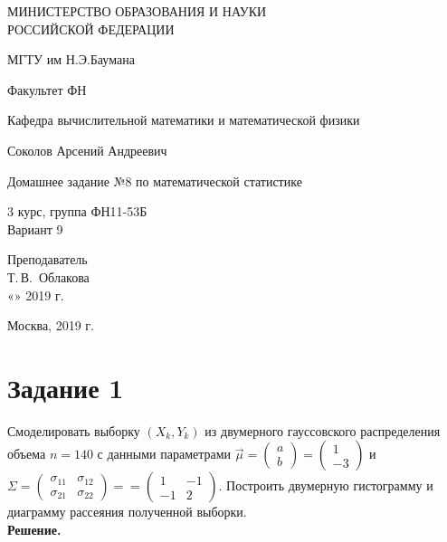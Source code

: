 \documentclass[14pt,a4paper]{scrartcl}
\begin{document}
	\begin{titlepage}
	\begin{center}
		\large
		МИНИСТЕРСТВО ОБРАЗОВАНИЯ И НАУКИ\\ РОССИЙСКОЙ ФЕДЕРАЦИИ
		
		\vspace{0.5cm}
		
		МГТУ им Н.Э.Баумана
		\vspace{0.25cm}
		
		Факультет ФН
		
		Кафедра вычислительной математики и математической физики
		\vfill
		
		
		Соколов Арсений Андреевич\\
		\vfill
		
		
		{\LARGE Домашнее задание №8 по математической статистике\\[2mm]
		}
		\bigskip
		
		3 курс, группа ФН11-53Б\\
		Вариант 9
	\end{center}
	\vfill
	
	\newlength{\ML}
	\hfill\begin{minipage}{0.4\textwidth}
		Преподаватель\\
		\underline{\hspace{3cm}} Т.\,В.~Облакова\\
		«\underline{\hspace{0.7cm}}» \underline{\hspace{1.71cm}} 2019 г.
	\end{minipage}%
	\bigskip
	
	
	\vfill
	
	\begin{center}
		Москва, 2019 г.
	\end{center}
\end{titlepage}

\section*{Задание 1}


Смоделировать выборку $(X_k, Y_k)$ из двумерного гауссовского распределения объема $n=140$ с данными параметрами $\vec{\mu} = \begin{pmatrix} a \\ b \end{pmatrix} = \begin{pmatrix} 1 \\ -3 \end{pmatrix}$ и $\Sigma = {\begin{pmatrix}
\sigma_{11} & \sigma_{12}\\
\sigma_{21} & \sigma_{22}
\end{pmatrix} =} =\begin{pmatrix}
1 & -1\\
-1 & 2
\end{pmatrix}$. Построить двумерную гистограмму и диаграмму рассеяния полученной выборки.\\
\textbf{Решение.}\\
\end{document}
